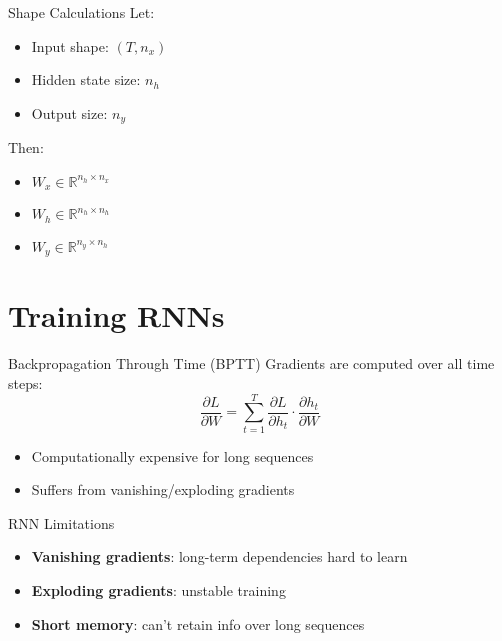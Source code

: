 \documentclass{beamer}
\begin{document}
\begin{frame}{Shape Calculations}
Let:
\begin{itemize}
    \item Input shape: \( (T, n_x) \)
    \item Hidden state size: \( n_h \)
    \item Output size: \( n_y \)
\end{itemize}
Then:
\begin{itemize}
    \item \( W_x \in \mathbb{R}^{n_h \times n_x} \)
    \item \( W_h \in \mathbb{R}^{n_h \times n_h} \)
    \item \( W_y \in \mathbb{R}^{n_y \times n_h} \)
\end{itemize}
\end{frame}

\section{Training RNNs}
\begin{frame}{Backpropagation Through Time (BPTT)}
Gradients are computed over all time steps:
\[
\frac{\partial L}{\partial W} = \sum_{t=1}^T \frac{\partial L}{\partial h_t} \cdot \frac{\partial h_t}{\partial W}
\]
\begin{itemize}
    \item Computationally expensive for long sequences
    \item Suffers from vanishing/exploding gradients
\end{itemize}
\end{frame}

\begin{frame}{RNN Limitations}
\begin{itemize}
    \item \textbf{Vanishing gradients}: long-term dependencies hard to learn
    \item \textbf{Exploding gradients}: unstable training
    \item \textbf{Short memory}: can't retain info over long sequences
\end{itemize}
\end{frame}

\end{document}
